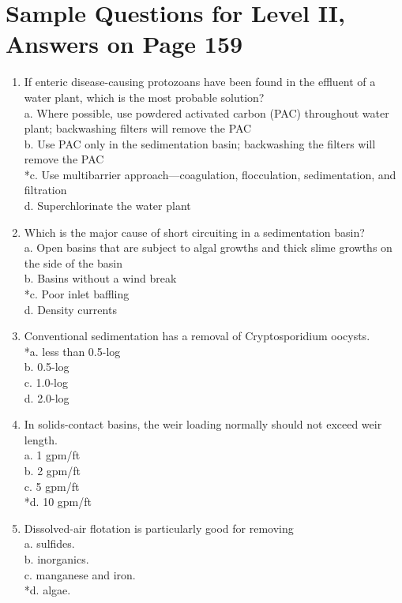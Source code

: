 \section{Sample Questions for Level II, Answers on Page 159}
\begin{enumerate}[label=TII-\arabic*]
  \item If enteric disease-causing protozoans have been found in the effluent of a water plant, which is the most probable solution?\\
a. Where possible, use powdered activated carbon (PAC) throughout water plant; backwashing filters will remove the PAC\\
b. Use PAC only in the sedimentation basin; backwashing the filters will remove the PAC\\
*c. Use multibarrier approach—coagulation, flocculation, sedimentation, and filtration\\
d. Superchlorinate the water plant \\
\item Which is the major cause of short circuiting in a sedimentation basin?\\
a. Open basins that are subject to algal growths and thick slime growths on the side of the basin\\
b. Basins without a wind break\\
*c. Poor inlet baffling\\
d. Density currents\\
  \item Conventional sedimentation has a removal of Cryptosporidium oocysts.\\
*a. less than 0.5-log\\
b. 0.5-log\\
c. 1.0-log\\
d. 2.0-log\\
  \item In solids-contact basins, the weir loading normally should not exceed weir length.\\
a. 1 gpm/ft\\
b. 2 gpm/ft\\
c. 5 gpm/ft\\
*d. 10 gpm/ft\\
  \item Dissolved-air flotation is particularly good for removing\\
a. sulfides.\\
b. inorganics.\\
c. manganese and iron.\\
*d. algae.\\
\end{enumerate}
